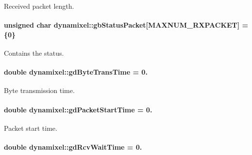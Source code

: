 Received packet length. 

\hypertarget{a00004_aa57c86d3bbbeaf5c9d4f6bd00376b04f}{}
\paragraph[{gb\+Status\+Packet}]{\setlength{\rightskip}{0pt plus 5cm}unsigned char dynamixel\+::gb\+Status\+Packet\mbox{[}M\+A\+X\+N\+U\+M\+\_\+\+R\+X\+P\+A\+C\+K\+E\+T\mbox{]} = \{0\}\hspace{0.3cm}{\ttfamily [private]}}\label{a00004_aa57c86d3bbbeaf5c9d4f6bd00376b04f}


Contains the status. 

\hypertarget{a00004_a2173f25c6299da7ddb37ba3d2bf1f738}{}
\paragraph[{gd\+Byte\+Trans\+Time}]{\setlength{\rightskip}{0pt plus 5cm}double dynamixel\+::gd\+Byte\+Trans\+Time = 0.\hspace{0.3cm}{\ttfamily [private]}}\label{a00004_a2173f25c6299da7ddb37ba3d2bf1f738}


Byte transmission time. 

\hypertarget{a00004_a6c6314fb7070e6fd361e57c5de17e0ec}{}
\paragraph[{gd\+Packet\+Start\+Time}]{\setlength{\rightskip}{0pt plus 5cm}double dynamixel\+::gd\+Packet\+Start\+Time = 0.\hspace{0.3cm}{\ttfamily [private]}}\label{a00004_a6c6314fb7070e6fd361e57c5de17e0ec}


Packet start time. 

\hypertarget{a00004_a9f47887864517d74955a2bc787ae4456}{}
\paragraph[{gd\+Rcv\+Wait\+Time}]{\setlength{\rightskip}{0pt plus 5cm}double dynamixel\+::gd\+Rcv\+Wait\+Time = 0.\hspace{0.3cm}{\ttfamily [private]}}\label{a00004_a9f47887864517d74955a2bc787ae4456}


